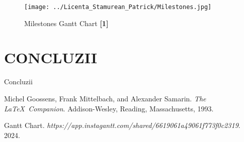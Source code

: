 \documentclass[12pt]{article}
\begin{document}
\begin{figure}[ht]
\centering
\texttt{[image: ../Licenta\_Stamurean\_Patrick/Milestones.jpg]}
\caption{Milestones Gantt Chart \textbf{[1]}}
\end{figure}


\newpage
\section{\uppercase{Concluzii}}
Concluzii



\newpage
\begin{thebibliography}{9}
Michel Goossens, Frank Mittelbach, and Alexander Samarin. 
\textit{The \LaTeX\ Companion}. 
Addison-Wesley, Reading, Massachusetts, 1993.
 
Gantt Chart. 
\textit{https://app.instagantt.com/shared/6619061a49061f773f0c2319}. 2024.
\end{thebibliography}
\end{document}
